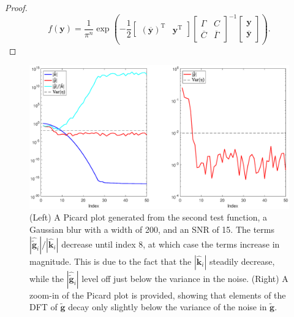 \documentclass[12pt]{article}
\newcommand{\gnoise}{\widetilde{\mathbf{g}}}
\newcommand{\kdis}{\mathbf{k}}
\newcommand{\trans}{\mathrm{T}}	%
\begin{document}
\begin{proof}
\begin{equation}
f(\bm{y}) = \frac{1}{\pi^n}\exp\left(-\frac{1}{2}\begin{bmatrix}
(\overline{\bm{y}})^\trans & \bm{y}^\trans
\end{bmatrix}
\begin{bmatrix}
\Gamma & C \\
\overline{C} & \overline{\Gamma}
\end{bmatrix}^{-1} \begin{bmatrix}
\bm{y} \\
\overline{\bm{y}}
\end{bmatrix}
\right).
\label{eq:Complex Normal Joint PDF Simplified}
\end{equation}

\end{proof}

\begin{figure}
	\centerline{\includegraphics[scale = 0.45]{Figures/PicardPlot1D_F2_S15_W200.eps}}
\caption{(Left) A Picard plot generated from the second test function, a Gaussian blur with a width of 200, and an SNR of 15. The terms $|\widehat{\gnoise}_i|/|\widehat{\kdis}_i|$ decrease until index 8, at which case the terms increase in magnitude. This is due to the fact that the $|\widehat{\kdis}_i|$ steadily decrease, while the $|\widehat{\gnoise}_i|$ level off just below the variance in the noise. (Right) A zoom-in of the Picard plot is provided, showing that elements of the DFT of $\gnoise$ decay only slightly below the variance of the noise in $\gnoise$.}
\label{PicardPlot}
\end{figure}
\end{document}
